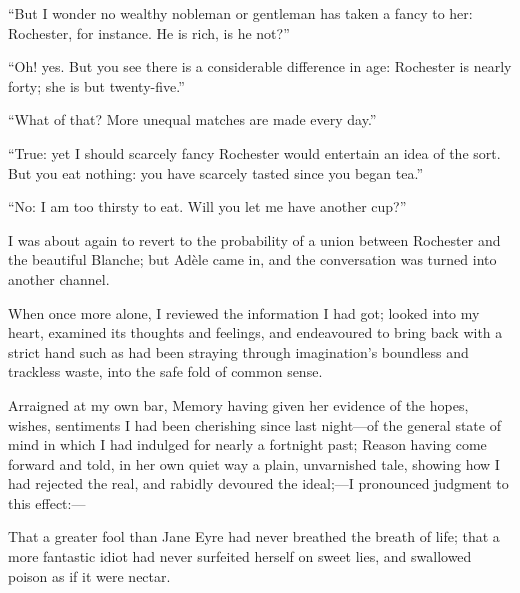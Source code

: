 \enquote{But I wonder no wealthy nobleman or gentleman has taken a fancy
to her: \Mr{} Rochester, for instance.  He is rich, is he not?}

\enquote{Oh! yes.  But you see there is a considerable difference in
age: \Mr{} Rochester is nearly forty; she is but twenty-five.}

\enquote{What of that?  More unequal matches are made every day.}

\enquote{True: yet I should scarcely fancy \Mr{} Rochester would entertain
an idea of the sort.  But you eat nothing: you have scarcely tasted
since you began tea.}

\enquote{No: I am too thirsty to eat.  Will you let me have another
cup?}

I was about again to revert to the probability of a union between \Mr{}
 Rochester and the beautiful Blanche; but Adèle came in, and the
conversation was turned into another channel.

When once more alone, I reviewed the information I had got; looked into
my heart, examined its thoughts and feelings, and endeavoured to bring
back with a strict hand such as had been straying through imagination's
boundless and trackless waste, into the safe fold of common sense.

Arraigned at my own bar, Memory having given her evidence of the hopes,
wishes, sentiments I had been cherishing since last night---of the
general state of mind in which I had indulged for nearly a fortnight
past; Reason having come forward and told, in her own quiet way a plain,
unvarnished tale, showing how I had rejected the real, and rabidly
devoured the ideal;---I pronounced judgment to this effect:---

That a greater fool than Jane Eyre had never breathed the breath of
life; that a more fantastic idiot had never surfeited herself on sweet
lies, and swallowed poison as if it were nectar.

